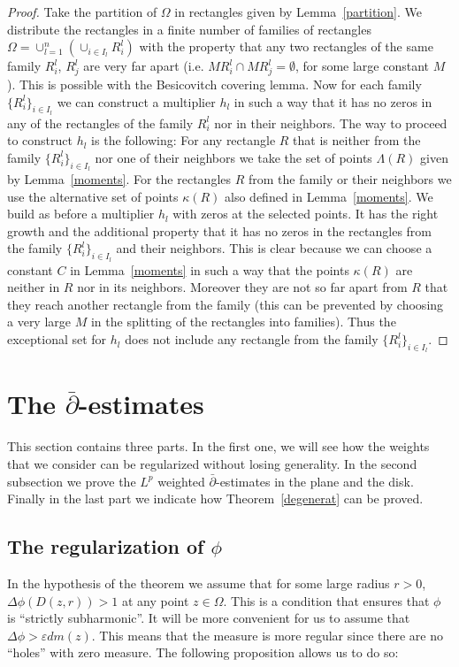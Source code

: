 \documentclass[12pt,twoside,final,psamsfonts]{amsart}
\theoremstyle{plain}
\theoremstyle{remark}
\theoremstyle{definition}
\begin{document}
\begin{proof}
Take the partition of $\Omega$ in rectangles given by Lemma~\ref{partition}. We
distribute the rectangles in a finite number of families of rectangles
$\Omega=\cup_{l=1}^n(\cup_{i\in I_l}R^l_i)$ with the property that any two
rectangles of the same family $R_i^l$, $R_j^l$ are very far apart (i.e.
$M R_i^l\cap M R_j^l=\emptyset$, for some large constant $M$). This is possible
with the Besicovitch covering lemma. Now for each family $\{R^l_i\}_{i\in I_l}$
we can construct a multiplier $h_l$ in such a way that it has no zeros in any of
the rectangles of the family $R^l_i$ nor in their neighbors. 
The way to proceed to construct $h_l$ is the following: For any rectangle
$R$ 
that is neither from the family $\{R^l_i\}_{i\in I_l}$ nor one of their
neighbors we take the set of points $\Lambda(R)$ given by Lemma~\ref{moments}.
For the rectangles $R$ from the family or their neighbors we use the
alternative set of points $\kappa(R)$ also defined in Lemma~\ref{moments}.
We build as before a multiplier $h_l$ with zeros at the selected points. 
It has the right growth and the
additional property that it has no zeros in the rectangles from the family 
$\{R^l_i\}_{i\in I_l}$ and
their neighbors. This is clear because we can choose a constant $C$ in
Lemma~\ref{moments} in such a way that the points $\kappa(R)$ are neither in $R$
nor in its neighbors. 
Moreover they are not so far apart from $R$ that they reach another
rectangle from the family 
(this can be prevented by choosing a very large $M$ in
the splitting of the rectangles into families). Thus the exceptional set for
$h_l$ does not include any rectangle from the family $\{R^l_i\}_{i\in I_l}$.
\end{proof}
\section{The $\bar\partial$-estimates}\label{demostracions}
This section contains three parts. In the first one, we will see how the
weights that we consider can be regularized without losing generality. In the
second subsection we prove the $L^p$ weighted $\bar\partial$-estimates in the
plane and the disk. Finally in the last part we indicate how
Theorem~\ref{degenerat} can be proved.

\subsection{The regularization of $\phi$}
In the hypothesis of the theorem we assume that for 
some large radius $r>0$, $\Delta \phi(D(z,r))>1$  at any point $z\in\Omega$. 
This is a condition that 
ensures that $\phi$ is ``strictly subharmonic''. It will be more convenient for
us to assume that $\Delta\phi >\varepsilon dm(z)$. This means that the measure
is  more regular since there are no ``holes'' with zero measure. The following 
proposition allows us to do so:
\end{document}
